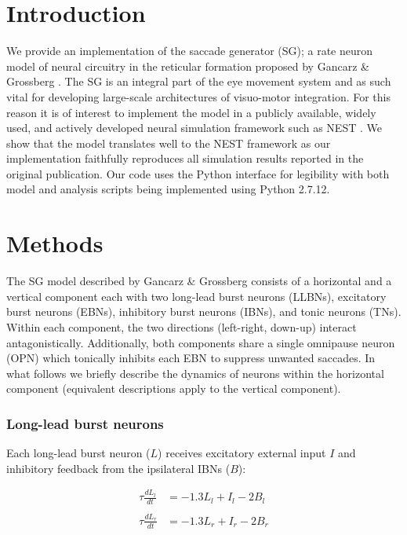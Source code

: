 \documentclass[10pt,a4paper,onecolumn]{article}
\begin{document}
\section{Introduction}\label{introduction}

We provide an implementation of the saccade generator (SG); a rate
neuron model of neural circuitry in the reticular formation proposed by
Gancarz \& Grossberg \autocite{Gancarz1998}. The SG is an integral part
of the eye movement system \autocite{Grossberg2012} and as such vital
for developing large-scale architectures of visuo-motor integration. For
this reason it is of interest to implement the model in a publicly
available, widely used, and actively developed neural simulation
framework such as NEST \autocite{Gewaltig2007}. We show that the model
translates well to the NEST framework as our implementation faithfully
reproduces all simulation results reported in the original publication.
Our code uses the Python interface \autocite{Eppler2008} for legibility
with both model and analysis scripts being implemented using Python
2.7.12.

\section{Methods}\label{methods}

The SG model described by Gancarz \& Grossberg \autocite{Gancarz1998}
consists of a horizontal and a vertical component each with two
long-lead burst neurons (LLBNs), excitatory burst neurons (EBNs),
inhibitory burst neurons (IBNs), and tonic neurons (TNs). Within each
component, the two directions (left-right, down-up) interact
antagonistically. Additionally, both components share a single omnipause
neuron (OPN) which tonically inhibits each EBN to suppress unwanted
saccades. In what follows we briefly describe the dynamics of neurons
within the horizontal component (equivalent descriptions apply to the
vertical component).

\subsubsection{Long-lead burst neurons}\label{long-lead-burst-neurons}

Each long-lead burst neuron (\(L\)) receives excitatory external input
\(I\) and inhibitory feedback from the ipsilateral IBNs (\(B\)):

\[
\begin{array}{ll}
\tau\frac{dL_l}{dt} &= -1.3L_l+I_l-2B_l \\\\
\tau\frac{dL_r}{dt} &= -1.3L_r+I_r-2B_r \\
\end{array}
\]
\end{document}
